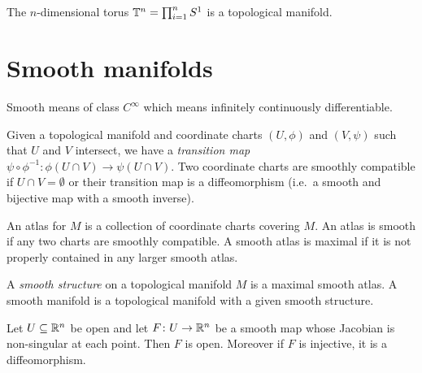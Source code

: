 \documentclass{skript}
\begin{document}
\begin{cor}
    The $n$-dimensional torus $\mathbb{T}^n = \prod_{i=1}^n S^1$ is a topological manifold.
\end{cor}

\section{Smooth manifolds}
\begin{note}
    Smooth means of class $C^\infty$ which means infinitely continuously differentiable.
\end{note}

\begin{definition}\label{def:transmap}
    Given a topological manifold and coordinate charts $(U,\phi)$ and $(V,\psi)$ such that $U$ and $V$ intersect, we have a \emph{transition map} $\psi\circ \phi^{-1}\colon \phi(U\cap V) \to \psi(U\cap V)$.
Two coordinate charts are smoothly compatible if $U\cap V = \emptyset$ or their transition map is a diffeomorphism (i.e.\ a smooth and bijective map with a smooth inverse). 

    An atlas for $M$ is a collection of coordinate charts covering $M$.
    An atlas is smooth if any two charts are smoothly compatible.
    A smooth atlas is maximal if it is not properly contained in any larger smooth atlas.
\end{definition}

\begin{definition}\label{def:smoothmanf}
    A \emph{smooth structure} on a topological manifold $M$ is a maximal smooth atlas.
    A smooth manifold is a topological manifold with a given smooth structure.
\end{definition}

\begin{lemma}\label{lem:opensmoothmaps}
    Let $U\subseteq \mathbb{R}^n$ be open and let $F\colon U\to\mathbb{R}^n$ be a smooth  map whose Jacobian is non-singular at each point. 
    Then $F$ is open.
    Moreover if $F$ is injective, it is a diffeomorphism.
\end{lemma}
\end{document}
